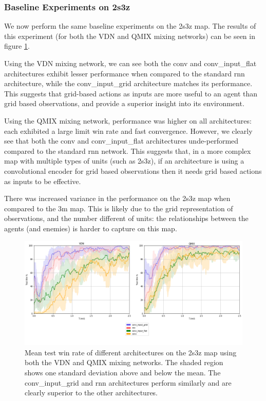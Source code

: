 \subsubsection{Baseline Experiments on 2s3z}
We now perform the same baseline experiments on the 2s3z map. The results of this experiment (for both the VDN and QMIX mixing networks) can be seen in figure \ref{fig:2s3z_all}.

Using the VDN mixing network, we can see both the conv and conv\_input\_flat architectures exhibit lesser performance when compared to the standard rnn architecture, while the conv\_input\_grid architecture matches its performance. This suggests that grid-based actions as inputs are more useful to an agent than grid based observations, and provide a superior insight into its environment.


Using the QMIX mixing network, performance was higher on all architectures: each exhibited a large limit win rate and fast convergence. However, we clearly see that both the conv and conv\_input\_flat architectures unde-performed compared to the standard rnn network. This suggests that, in a more complex map with multiple types of units (such as 2s3z), if an architecture is using a convolutional encoder for grid based observations then it needs grid based actions as inputs to be effective. 

There was increased variance in the performance on the 2s3z map when compared to the 3m map. This is likely due to the grid representation of observations, and the number different of units: the relationships between the agents (and enemies) is harder to capture on this map.

\begin{figure}[h]
    \centering
    \hbox{\hspace{-6.35em}\includegraphics[width=1.34\textwidth]{images/graphs/all2s3z.png}}
    \caption{Mean test win rate of different architectures on the 2s3z map using both the VDN and QMIX mixing networks. The shaded region shows one standard deviation above and below the mean. The conv\_input\_grid and rnn architectures perform similarly and are clearly superior to the other architectures.}
    \label{fig:2s3z_all}
\end{figure}





